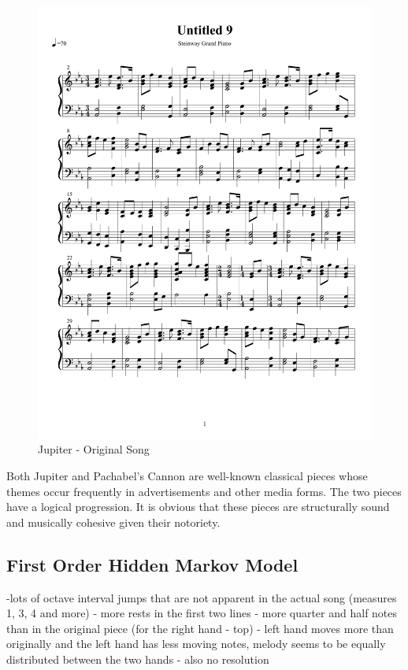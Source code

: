 \documentclass{article} %
\begin{document}
\begin{figure}[H]
\centering
\caption{Jupiter - Original Song}
\includegraphics [scale = 0.6] {JupiterOriginal-cropped.pdf}
\end{figure}

Both Jupiter and Pachabel's Cannon are well-known classical pieces whose themes occur frequently in advertisements and other media forms. The two pieces have a logical progression. It is obvious that these pieces are structurally sound and musically cohesive given their notoriety. 

\subsection{First Order Hidden Markov Model}

-lots of octave interval jumps that are not apparent in the actual song (measures 1, 3, 4 and more)
- more rests in the first two lines
- more quarter and half notes than in the original piece (for the right hand - top)
- left hand moves more than originally and the left hand has less moving notes, melody seems to be equally distributed between the two hands
- also no resolution
\end{document}
